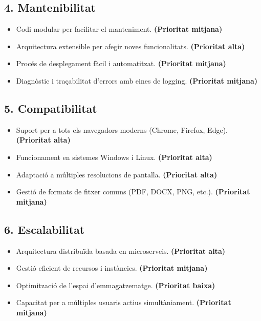 \subsection{4. Mantenibilitat}
\begin{itemize}
  \item Codi modular per facilitar el manteniment. \textbf{(Prioritat mitjana)}
  \item Arquitectura extensible per afegir noves funcionalitats. \textbf{(Prioritat alta)}
  \item Procés de desplegament fàcil i automatitzat. \textbf{(Prioritat mitjana)}
  \item Diagnòstic i traçabilitat d'errors amb eines de logging. \textbf{(Prioritat mitjana)}
\end{itemize}

\subsection{5. Compatibilitat}
\begin{itemize}
  \item Suport per a tots els navegadors moderns (Chrome, Firefox, Edge). \textbf{(Prioritat alta)}
  \item Funcionament en sistemes Windows i Linux. \textbf{(Prioritat alta)}
  \item Adaptació a múltiples resolucions de pantalla. \textbf{(Prioritat alta)}
  \item Gestió de formats de fitxer comuns (PDF, DOCX, PNG, etc.). \textbf{(Prioritat mitjana)}
\end{itemize}

\subsection{6. Escalabilitat}
\begin{itemize}
  \item Arquitectura distribuïda basada en microserveis. \textbf{(Prioritat alta)}
  \item Gestió eficient de recursos i instàncies. \textbf{(Prioritat mitjana)}
  \item Optimització de l'espai d'emmagatzematge. \textbf{(Prioritat baixa)}
  \item Capacitat per a múltiples usuaris actius simultàniament. \textbf{(Prioritat mitjana)}
\end{itemize}

